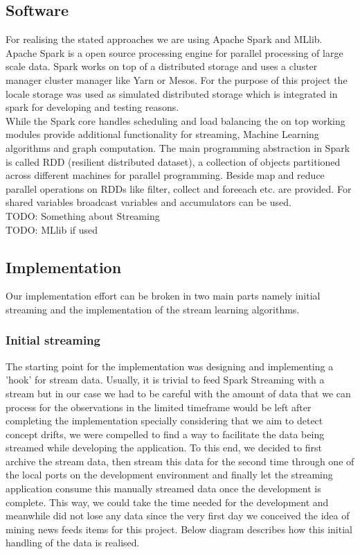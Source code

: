 \documentclass[12pt]{article}
\begin{document}
\subsection{Software}
For realising the stated approaches we are using Apache Spark and MLlib. Apache Spark is a open source processing engine for parallel processing of large scale data. Spark works on top of a distributed storage and uses a cluster manager cluster manager like Yarn or Mesos. For the purpose of this project the locale storage was used as simulated distributed storage which is integrated in spark for developing and testing reasons.  \\
While the Spark core handles scheduling and load balancing the on top working modules provide additional functionality for streaming, Machine Learning  algorithms and graph computation. The main programming abstraction in Spark is called RDD (resilient distributed dataset), a collection of objects partitioned across different machines for parallel programming. Beside map and reduce parallel operations on RDDs like filter, collect and foreeach etc. are provided. For shared variables broadcast variables and  accumulators can be used.
\\ 
TODO: Something about Streaming
\\
TODO: MLlib if used


\newpage
\subsection{Implementation}

Our implementation effort can be broken in two main parts namely initial streaming and the implementation of the stream learning algorithms.

\subsubsection{Initial streaming}

The starting point for the implementation was designing and implementing a 'hook' for stream data. Usually, it is trivial to feed Spark Streaming with a stream but in our case we had to be careful with the amount of data that we can process for the observations in the limited timeframe would be left after completing the implementation  specially considering that we aim to detect concept drifts, we were compelled to find a way to facilitate the data being streamed while developing the application. To this end, we decided to first archive the stream data, then stream this data for the second time through one of the local ports on the development environment and finally let the streaming application consume this manually streamed data once the development is complete. This way, we could take the time needed for the development and meanwhile did not lose any data since the very first day we conceived the idea of mining news feeds items for this project. Below diagram describes how this initial handling of the data is realised. 
\end{document}
